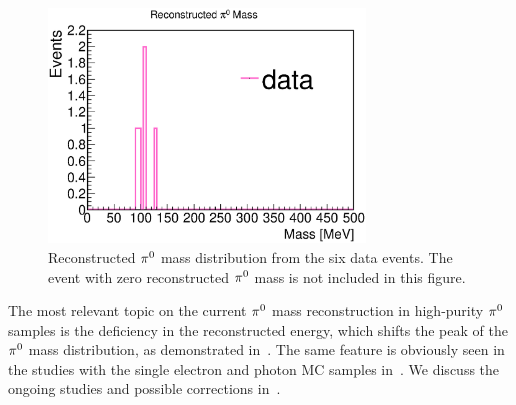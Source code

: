 \begin{figure}[htbp]
\begin{center}
\includegraphics[width=0.75\textwidth]{figs/datapi0/data/RecoPi0Mass.eps}
\caption{Reconstructed ${\pi}^0$ mass distribution from the six data events.
The event with zero reconstructed ${\pi}^0$ mass is not included in this
figure.}
\label{fig:mpi0_data}
\end{center}
\end{figure}



The most relevant topic on the current ${\pi}^0$ mass reconstruction
in high-purity ${\pi}^0$ samples is the deficiency in the reconstructed
energy, which shifts the peak of the ${\pi}^0$ mass distribution, as
demonstrated in~.
The same feature is obviously seen in the studies with the single electron
and photon MC samples in~.
We discuss the ongoing studies and possible corrections in~.


